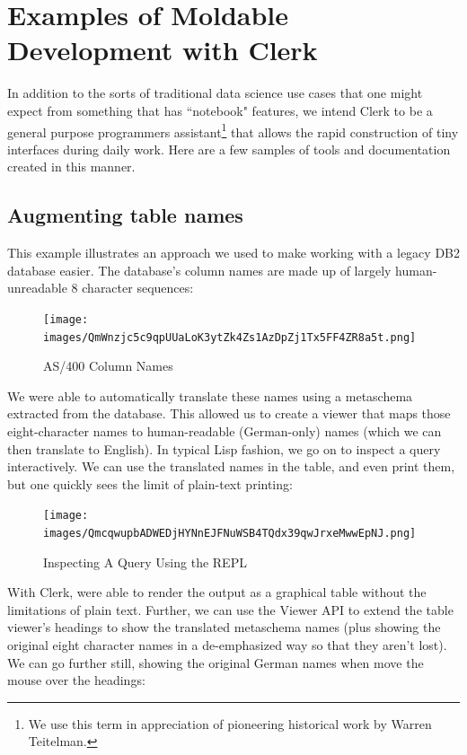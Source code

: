 \documentclass[sigconf,screen]{acmart}
\begin{document}
\hypertarget{examples-of-moldable-development-with-clerk}{%
\section{Examples of Moldable Development with Clerk}\label{examples-of-moldable-development-with-clerk}}

In addition to the sorts of traditional data science use cases that one might expect from something that has ``notebook" features, we intend Clerk to be a general purpose programmer\textquotesingle s assistant\footnote{We use this term in appreciation of pioneering historical work by Warren Teitelman.} that allows the rapid construction of tiny interfaces during daily work. Here are a few samples of tools and documentation created in this manner.

\hypertarget{augmenting-table-names}{%
\subsection{Augmenting table names}\label{augmenting-table-names}}

This example illustrates an approach we used to make working with a legacy DB2 database easier. The database's column names are made up of largely human-unreadable 8 character sequences:

\begin{figure}
\hypertarget{as400-column-names}{%
\centering
\texttt{[image: images/QmWnzjc5c9qpUUaLoK3ytZk4Zs1AzDpZj1Tx5FF4ZR8a5t.png]}
\caption{AS/400 Column Names}\label{as400-column-names}
}
\end{figure}

We were able to automatically translate these names using a metaschema extracted from the database. This allowed us to create a viewer that maps those eight-character names to human-readable (German-only) names (which we can then translate to English). In typical Lisp fashion, we go on to inspect a query interactively. We can use the translated names in the table, and even print them, but one quickly sees the limit of plain-text printing:

\begin{figure}
\hypertarget{inspecting-a-query-using-the-repl}{%
\centering
\texttt{[image: images/QmcqwupbADWEDjHYNnEJFNuWSB4TQdx39qwJrxeMwwEpNJ.png]}
\caption{Inspecting A Query Using the REPL}\label{inspecting-a-query-using-the-repl}
}
\end{figure}

With Clerk, were able to render the output as a graphical table without the limitations of plain text. Further, we can use the Viewer API to extend the table viewer's headings to show the translated metaschema names (plus showing the original eight character names in a de-emphasized way so that they aren't lost). We can go further still, showing the original German names when move the mouse over the headings:
\end{document}
